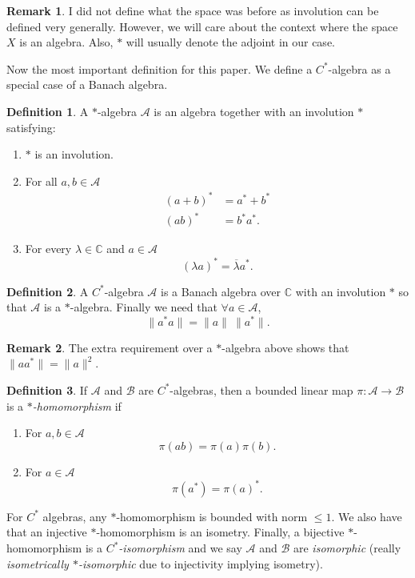 \documentclass[leqno]{article}
\theoremstyle{definition}
\newtheorem{definition}{Definition}[section]
\newtheorem*{remark}{Remark}
\theoremstyle{remark}
\theoremstyle{theorem}
\newcommand{\A}{\mathcal{A}}
\newcommand{\C}{\mathbb{C}}
\begin{document}
\begin{remark}
I did not define what the space was before as involution can be defined very generally.  However, we will care about the context where the space $X$ is an algebra.  Also, $*$ will usually denote the adjoint in our case.
\end{remark}

\noindent Now the most important definition for this paper. We define a $C^*$-algebra as a special case of a Banach algebra. 

\begin{definition}
A $*$-algebra $\A$ is an algebra together with an involution $*$ satisfying:
\begin{enumerate}[1.]
\item $*$ is an involution.
\item For all $a,b\in \A$
\begin{align*}
(a+b)^*&=a^*+b^*\\
(ab)^*&=b^*a^*.
\end{align*}
\item For every $\lambda \in \C$ and $a\in \A$
\[
(\lambda a)^*=\overline{\lambda}a^*.
\]
\end{enumerate}
\end{definition}

\begin{definition}
A $C^*$-algebra $\A$ is a Banach algebra over $\C$ with an involution $*$ so that $\A$ is a $*$-algebra.  Finally we need that $\forall a\in \A$,
\[
\|a^*a\|=\|a\|~\|a^*\|.
\]
\end{definition}

\begin{remark}
The extra requirement over a $*$-algebra above shows that $\|aa^*\|=\|a\|^2$.
\end{remark}

\begin{definition}
If $\A$ and $\mathcal{B}$ are $C^*$-algebras, then a bounded linear map $\pi\colon \A \to \mathcal{B}$ is a \emph{$*$-homomorphism} if
\begin{enumerate}[1.]
\item For $a,b\in \A$
\[
\pi(ab)=\pi(a)\pi(b).
\]
\item For $a\in \A$
\[
\pi(a^*)=\pi(a)^*.
\]
\end{enumerate}
For $C^*$ algebras, any $*$-homomorphism is bounded with norm $\leq 1$. We also have that an injective $*$-homomorphism is an isometry.  Finally, a bijective $*$-homomorphism is a \emph{$C^*$-isomorphism} and we say $\A$ and $\mathcal{B}$ are \emph{isomorphic} (really \emph{isometrically  $*$-isomorphic} due to injectivity implying isometry).
\end{definition}
\end{document}
